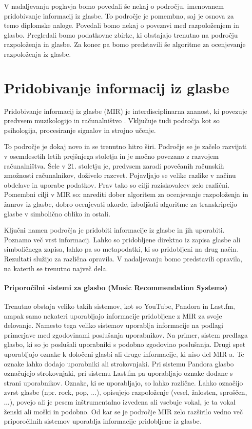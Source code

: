 \documentclass[a4paper, 12pt]{book}
\begin{document}
{V nadaljevanju poglavja bomo povedali še nekaj o področju, imenovanem pridobivanje informacij iz glasbe. To področje je pomembno, saj je osnova za temo diplomske naloge. Povedali bomo nekaj o povezavi med razpoloženjem in glasbo. Pregledali bomo podatkovne zbirke, ki obstajajo trenutno na področju razpoloženja in glasbe. Za konec pa bomo predstavili še algoritme za ocenjevanje razpoloženja iz glasbe. 

\section{Pridobivanje informacij iz glasbe}

Pridobivanje informacij iz glasbe (MIR) je interdisciplinarna znanost, ki povezuje predvsem muzikologijo in računalništvo \cite{pesek2012prepoznavanje}. Vključuje tudi področja kot so psihologija, procesiranje signalov in strojno učenje.

To področje je dokaj novo in se trenutno hitro širi. Področje se je začelo razvijati v osemdesetih letih prejšnjega stoletja in je močno povezano z razvojem računalništva. Šele v 21. stoletju je, predvsem zaradi povečanih računskih zmožnosti računalnikov, doživelo razcvet. Pojavljajo se velike razlike v načinu obdelave in uporabe podatkov. Prav tako so cilji raziskovalcev zelo različni. Pomembni cilji v MIR so: narediti dober algoritem za ocenjevanje razpoloženja in žanrov iz glasbe, dobro ocenjevati akorde, izboljšati algoritme za transkripcijo glasbe v simbolično obliko in ostali. 

Ključni namen področja je pridobiti informacije iz glasbe in jih uporabiti. Poznamo več vrst informacij. Lahko so pridobljene direktno iz zapisa glasbe ali simboličnega zapisa, lahko pa so metapodatki, ki so pridobljeni na drug način. Rezultati služijo za različna opravila. V nadaljevanju bomo predstavili opravila, na katerih se trenutno največ dela.

\paragraph{Priporočilni sistemi za glasbo (Music Recommendation Systems)}

Trenutno obstaja veliko takih sistemov, kot so YouTube, Pandora in Last.fm, ampak samo nekateri uporabljajo informacije pridobljene z MIR za svoje delovanje. Namesto tega veliko sistemov uporablja informacije na podlagi primerjave med zgodovinami poslušanja uporabnikov. Na primer, sistem predlaga glasbo, ki so jo poslušali uporabniki s podobno zgodovino poslušanja. Drugi spet uporabljajo oznake k določeni glasbi ali druge informacije, ki niso del MIR-a. Te oznake lahko dodajo uporabniki ali strokovnjaki. Pri sistemu Pandora glasbo označujejo strokovnjaki, pri sistemu Last.fm pa uporabljajo oznake dodane s strani uporabnikov. Oznake, ki se uporabljajo, so lahko različne. Lahko označijo zvrst glasbe (npr. rock, pop, ...), opisujejo razpoloženje (vesel, žalosten, sproščen, ...), povejo ali je pesem inštrumentalno izvedena ali vsebuje vokal, je ta vokal ženski ali moški in podobno. Od kar se je področje MIR zelo razširilo vedno več priporočilnih sistemov uporablja informacije pridobljene iz glasbe. 
 
}
\end{document}
